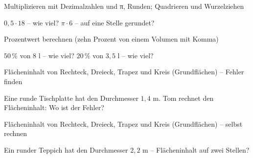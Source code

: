 \begin{aufgabe}{Multiplizieren mit Dezimalzahlen und π, Runden; Quadrieren und Wurzelziehen}
\begin{teile}
\teil $0{,}5 \cdot 18$ – wie viel? \leerfeld
\teil $\pi \cdot 6$ – auf eine Stelle gerundet? \leerfeld
\end{teile}
\end{aufgabe}

\begin{aufgabe}{Prozentwert berechnen (zehn Prozent von einem Volumen mit Komma)}
\begin{teile}
\teil $50\,\%$ von $8$ l – wie viel? \leerfeld[l]
\teil $20\,\%$ von $3{,}5$ l – wie viel? \leerfeld[l]
\end{teile}
\end{aufgabe}

\begin{aufgabe}{Flächeninhalt von Rechteck, Dreieck, Trapez und Kreis (Grundflächen) – Fehler finden}
\begin{teile}
\teil Eine runde Tischplatte hat den Durchmesser $1{,}4$ m. Tom rechnet den Flächeninhalt:  Wo ist der Fehler?
\end{teile}
\end{aufgabe}

\begin{aufgabe}{Flächeninhalt von Rechteck, Dreieck, Trapez und Kreis (Grundflächen) – selbst rechnen}
\begin{teile}
\teil Ein runder Teppich hat den Durchmesser $2{,}2$ m – Flächeninhalt auf zwei Stellen? \leerfeld[m²]
\end{teile}
\end{aufgabe}
